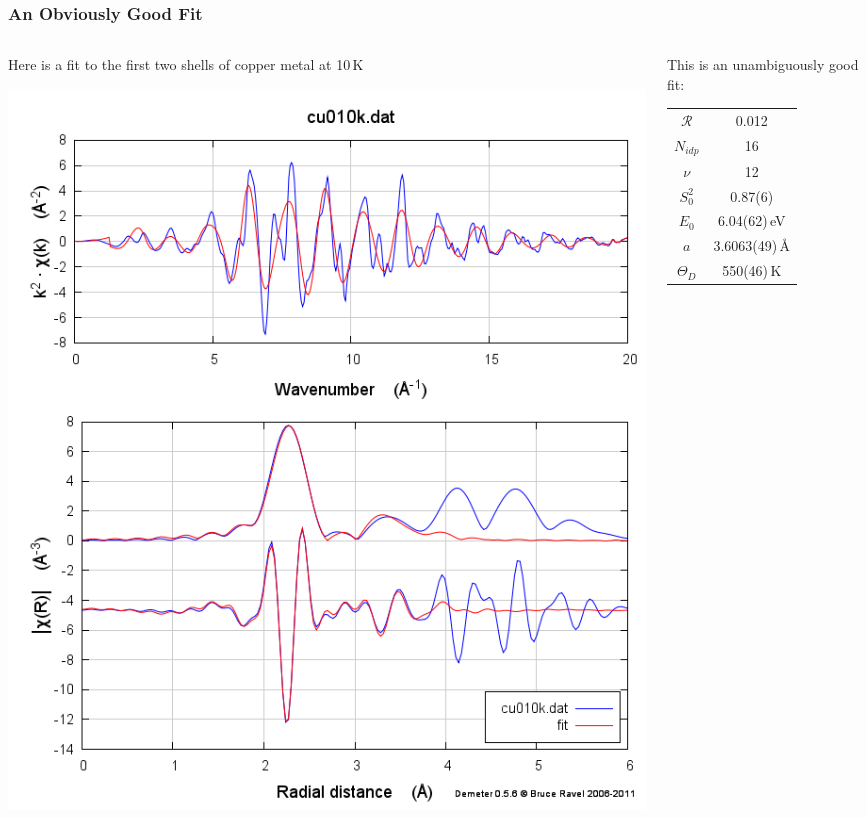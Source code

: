 \documentclass[10pt, xcolor=x11names, compress]{beamer}
\begin{document}
\begin{frame}
  \frametitle{An Obviously Good Fit}
  \begin{columns}[T]
    \begin{column}{0.4\linewidth}
      \begin{block}{}
        \begin{center}
          Here is a fit to the first two shells of copper metal at
          10\,K
        \end{center}
      \end{block}
      \includegraphics[width=\linewidth]{info/cufit.png}      
    \end{column}
    \begin{column}{0.6\linewidth}
      \begin{center}
        This is an unambiguously good fit:
        
        \medskip

        \begin{tabular}{cc}
          $\mathcal{R}$ & 0.012 \\
          $N_{idp}$     & 16 \\
          $\nu$         & 12\\[1.5ex]
          $S_0^2$       & 0.87(6) \\
          $E_0$         & 6.04(62)\,eV \\
          $a$           & 3.6063(49)\,\AA \\
          $\Theta_D$    & 550(46)\,K \\
        \end{tabular}


\end{center}
\end{column}
\end{columns}
\end{frame}
\end{document}

